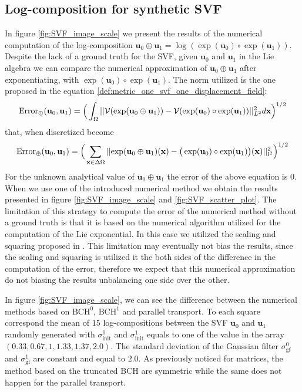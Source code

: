 \subsection{Log-composition for synthetic SVF}
In figure \ref{fig:SVF_image_scale} we present the results of the numerical computation of the log-composition $\mathbf{u}_0\oplus\mathbf{u}_1 = \log(\exp(\mathbf{u}_0)\circ \exp(\mathbf{u}_1))$. Despite the lack of a ground truth for the SVF, given $\mathbf{u}_0$ and $\mathbf{u}_1$ in the Lie algebra we can compare the numerical approximation of $\mathbf{u}_0\oplus\mathbf{u}_1$ after exponentiating, with $\exp(\mathbf{u}_0)\circ \exp(\mathbf{u}_1)$. The norm utilized is the one proposed in the equation \ref{def:metric_one_svf_one_displacement_field}:
\begin{align}
\text{Error}_{\oplus}(\mathbf{u}_0, \mathbf{u}_1)
= 
\Big(\int_{\Omega} \vert\lvert \mathcal{V}(\exp(\mathbf{u}_0\oplus\mathbf{u}_1)) - \mathcal{V}(\exp(\mathbf{u}_0)\circ \exp(\mathbf{u}_1)) \rvert\vert_{L^2}^{2} d\mathbf{x} \Big)^{1/2}
\end{align} 
that, when discretized become
\begin{align}\label{eq:error_svf_sythetic_data}
\text{Error}_{\oplus}(\mathbf{u}_0, \mathbf{u}_1) 
= 
\Big( \sum_{\mathbf{x} \in \Delta\Omega} 
\vert\lvert \exp(\mathbf{u}_0\oplus\mathbf{u}_1)(\mathbf{x}) 
	-
\big(\exp(\mathbf{u}_0)\circ \exp(\mathbf{u}_1)\big)(\mathbf{x}) 
	   \rvert\vert_{l^2}^{2}  \Big)^{1/2}
\end{align} 
For the unknown analytical value of $\mathbf{u}_0\oplus\mathbf{u}_1$ the error of the above equation is $0$. When we use one of the introduced numerical method we obtain the results presented in figure \ref{fig:SVF_image_scale} and \ref{fig:SVF_scatter_plot}. The limitation of this strategy to compute the error of the numerical method without a ground truth is that it is based on the numerical algorithm utilized for the computation of the Lie exponential. In this case we utilized the scaling and squaring proposed in \cite{arsigny2006log}. This limitation may eventually not bias the results, since the scaling and squaring is utilized it the both sides of the difference in the computation of the error, therefore we expect that this numerical approximation do not biasing the results unbalancing one side over the other.

In figure \ref{fig:SVF_image_scale}, we can see the difference between the numerical methods based on $\text{BCH}^0$, $\text{BCH}^1$ and parallel transport. To each square correspond the mean of $15$ log-compositions between the SVF $\mathbf{u}_0$ and $\mathbf{u}_1$ randomly generated with $\sigma_{\text{init}}^{0}$ and $\sigma_{\text{init}}^{1}$ equals to one of the value in the array $(0.33, 0.67, 1, 1.33, 1.37, 2.0)$. The standard deviation of the Gaussian filter $\sigma_{\text{gf}}^{0}$ and $\sigma_{\text{gf}}^{1}$ are constant and equal to $2.0$. As previously noticed for matrices, the method based on the truncated  BCH are symmetric while the same does not happen for the parallel transport. 

